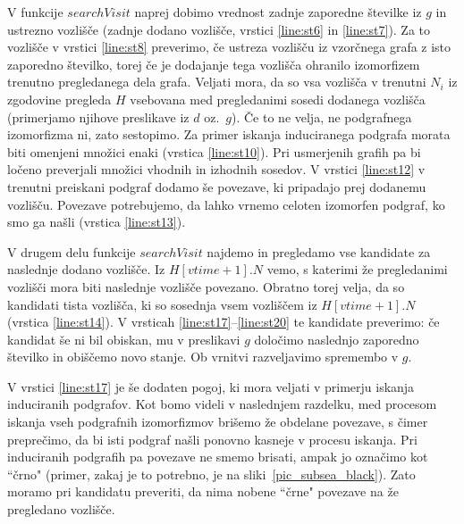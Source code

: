 \documentclass[a4paper, 12pt, ]{book}
\begin{document}
	V funkcije $searchVisit$ naprej dobimo vrednost zadnje zaporedne številke iz $g$ in ustrezno vozlišče (zadnje dodano vozlišče, vrstici \ref{line:st6}
	in  \ref{line:st7}). Za to vozlišče v vrstici \ref{line:st8} preverimo, če ustreza vozlišču iz vzorčnega grafa z isto zaporedno številko, torej če je
	dodajanje tega vozlišča ohranilo izomorfizem trenutno pregledanega dela grafa. Veljati mora, da so vsa vozlišča v trenutni $N_i$ iz zgodovine
	pregleda $H$ vsebovana med pregledanimi sosedi dodanega vozlišča (primerjamo njihove preslikave iz $d$ oz.~$g$). Če to ne velja, ne podgrafnega
	izomorfizma ni, zato sestopimo. Za primer iskanja induciranega podgrafa morata biti omenjeni množici enaki (vrstica  \ref{line:st10}). Pri usmerjenih
	grafih pa bi ločeno preverjali množici vhodnih in izhodnih sosedov. V vrstici \ref{line:st12} v trenutni preiskani podgraf dodamo še povezave, ki
	pripadajo prej dodanemu vozlišču. Povezave potrebujemo, da lahko vrnemo celoten izomorfen podgraf, ko smo ga našli (vrstica  \ref{line:st13}).
	
	V drugem delu funkcije $searchVisit$ najdemo in pregledamo vse kandidate za naslednje dodano vozlišče. Iz $H[vtime + 1].N$ vemo, s katerimi že 
	pregledanimi vozlišči mora biti naslednje vozlišče povezano. Obratno torej velja, da so kandidati tista vozlišča, ki so sosednja vsem vozliščem iz 
	$H[vtime + 1].N$ (vrstica \ref{line:st14}). V vrsticah \ref{line:st17}--\ref{line:st20} te kandidate preverimo: če kandidat še ni bil obiskan, mu
	v preslikavi $g$ določimo naslednjo zaporedno številko in obiščemo novo stanje. Ob vrnitvi razveljavimo spremembo v $g$.
	
	V vrstici \ref{line:st17} je še dodaten pogoj, ki mora veljati v primerju iskanja induciranih podgrafov. Kot bomo videli v naslednjem razdelku, med
	procesom iskanja vseh podgrafnih izomorfizmov brišemo že obdelane povezave, s čimer preprečimo, da bi isti podgraf našli ponovno kasneje v
	procesu iskanja. Pri induciranih podgrafih pa povezave ne smemo brisati, ampak jo	označimo kot ``črno" (primer, zakaj je to potrebno, je na 
	sliki~\ref{pic_subsea_black}). Zato moramo pri kandidatu preveriti, da nima nobene ``črne" povezave na že pregledano vozlišče.
	
\end{document}
